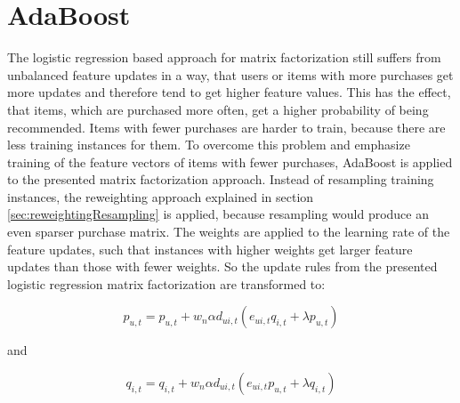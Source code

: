 \documentclass[10pt]{reportMaster}
\begin{document}
\section{AdaBoost}
\label{sec:myAdaBoost}
The logistic regression based approach for matrix factorization still suffers from unbalanced feature updates in a way, that users or items with more purchases get more updates and therefore tend to get higher feature values.
This has the effect, that items, which are purchased more often, get a higher probability of being recommended.
Items with fewer purchases are harder to train, because there are less training instances for them.
To overcome this problem and emphasize training of the feature vectors of items with fewer purchases, AdaBoost is applied to the presented matrix factorization approach.
Instead of resampling training instances, the reweighting approach explained in section \ref{sec:reweightingResampling} is applied, because resampling would produce an even sparser purchase matrix.
The weights are applied to the learning rate of the feature updates, such that instances with higher weights get larger feature updates than those with fewer weights.
So the update rules from the presented logistic regression matrix factorization are transformed to: 

\begin{equation}
p_{u,t} = p_{u,t} + w_n \alpha d_{ui,t} (e_{ui,t} q_{i,t} + \lambda p_{u,t})
\end{equation}

and 

\begin{equation}
q_{i,t} = q_{i,t} + w_n \alpha d_{ui,t} (e_{ui,t} p_{u,t} + \lambda q_{i,t})
\end{equation}
\end{document}
